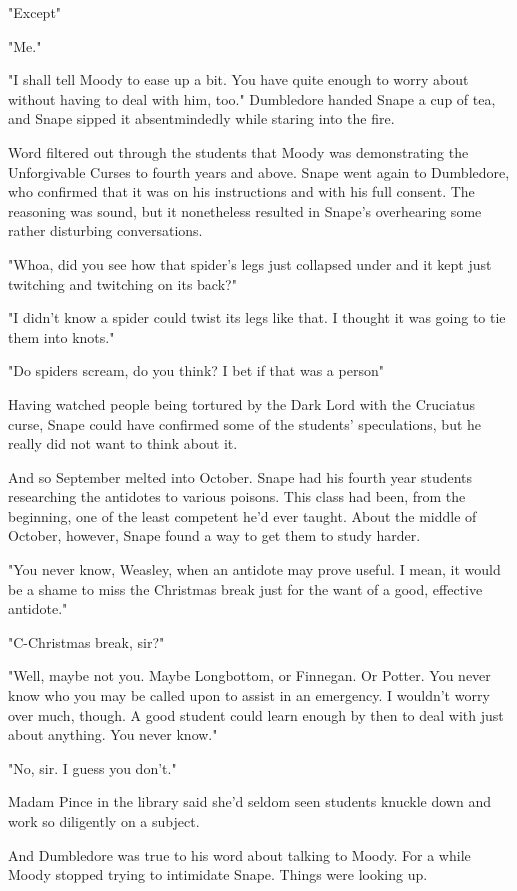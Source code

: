 "Except{\el}"

"Me."

"I shall tell Moody to ease up a bit. You have quite enough to worry about without having to deal with him, too." Dumbledore handed Snape a cup of tea, and Snape sipped it absentmindedly while staring into the fire.

Word filtered out through the students that Moody was demonstrating the Unforgivable Curses to fourth years and above. Snape went again to Dumbledore, who confirmed that it was on his instructions and with his full consent. The reasoning was sound, but it nonetheless resulted in Snape's overhearing some rather disturbing conversations.

"Whoa, did you see how that spider's legs just collapsed under and it kept just twitching and twitching on its back?"

"I didn't know a spider could twist its legs like that. I thought it was going to tie them into knots."

"Do spiders scream, do you think? I bet if that was a person{\el}"

Having watched people being tortured by the Dark Lord with the Cruciatus curse, Snape could have confirmed some of the students' speculations, but he really did not want to think about it.

And so September melted into October. Snape had his fourth year students researching the antidotes to various poisons. This class had been, from the beginning, one of the least competent he'd ever taught. About the middle of October, however, Snape found a way to get them to study harder.

"You never know, Weasley, when an antidote may prove useful. I mean, it would be a shame to miss the Christmas break just for the want of a good, effective antidote."

"C-Christmas break, sir?"

"Well, maybe not you. Maybe Longbottom, or Finnegan. Or Potter. You never know who you may be called upon to assist in an emergency. I wouldn't worry over much, though. A good student could learn enough by then to deal with just about anything. You never know."

"No, sir. I guess you don't."

Madam Pince in the library said she'd seldom seen students knuckle down and work so diligently on a subject.

And Dumbledore was true to his word about talking to Moody. For a while Moody stopped trying to intimidate Snape. Things were looking up.

